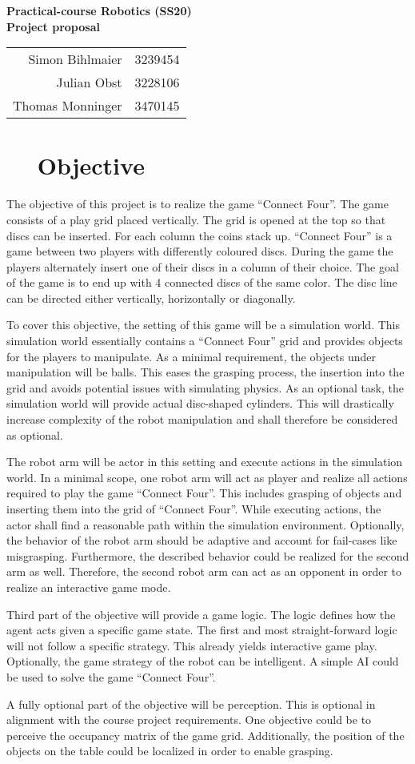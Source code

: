 \documentclass[11pt,pdftex,a4paper]{article}
\newcounter{sheetnumber}
\newcounter{exnum}
\renewcommand{\title}
{\begin{center}
		\begin{Huge}
            \textbf{Practical-course Robotics (SS20)}\\[0.3cm]
			 \textbf{Project proposal} \\[0.3cm]
		\end{Huge}
		
		\begin{tabular}{rl}
			Simon Bihlmaier	 	 & 3239454 \\
			Julian Obst 		 & 3228106 \\
			Thomas Monninger	 & 3470145 \\
		\end{tabular}
		
	\end{center}
	
}
\newcommand{\ex}[1]{\section*{\theexnum $\quad$ #1 \stepcounter{exnum}}}
\begin{document}
	
	
	\setcounter{exnum}{1}
	\setcounter{sheetnumber}{0}
	\thispagestyle{empty}
	\title

    \ex{Objective}
	The objective of this project is to realize the game ``Connect Four''. 
	The game consists of a play grid placed vertically. 
	The grid is opened at the top so that discs can be inserted. 
	For each column the coins stack up. 
	``Connect Four'' is a game between two players with differently coloured discs. 
	During the game the players alternately insert one of their discs in a column of their choice. 
	The goal of the game is to end up with 4 connected discs of the same color. 
	The disc line can be directed either vertically, horizontally or diagonally.
	
	To cover this objective, the setting of this game will be a simulation world. 
	This simulation world essentially contains a ``Connect Four'' grid and provides objects for the players to manipulate. 
	As a minimal requirement, the objects under manipulation will be balls. 
	This eases the grasping process, the insertion into the grid and avoids potential issues with simulating physics. 
	As an optional task, the simulation world will provide actual disc-shaped cylinders. 
	This will drastically increase complexity of the robot manipulation and shall therefore be considered as optional. 
	
	The robot arm will be actor in this setting and execute actions in the simulation world.
	In a minimal scope, one robot arm will act as player and realize all actions required to play the game ``Connect Four''. 
	This includes grasping of objects and inserting them into the grid of ``Connect Four''. 
	While executing actions, the actor shall find a reasonable path within the simulation environment. 
	Optionally, the behavior of the robot arm should be adaptive and account for fail-cases like misgrasping. 
	Furthermore, the described behavior could be realized for the second arm as well. 
	Therefore, the second robot arm  can act as an opponent in order to realize an interactive game mode.
	
	Third part of the objective will provide a game logic. 
	The logic defines how the agent acts given a specific game state.
	The first and most straight-forward logic will not follow a specific strategy. 
	This already yields interactive game play. 
	Optionally, the game strategy of the robot can be intelligent.
	A simple AI could be used to solve the game ``Connect Four''.
	 
	A fully optional part of the objective will be perception. 
	This is optional in alignment with the course project requirements. 
	One objective could be to perceive the occupancy matrix of the game grid.
	Additionally, the position of the objects on the table could be localized in order to enable grasping.
	
\end{document}
